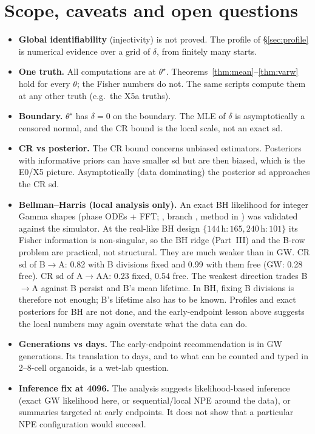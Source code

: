 \documentclass[11pt]{article}
\theoremstyle{definition}
\theoremstyle{remark}
\newcommand{\code}[1]{\texttt{\detokenize{#1}}}
\begin{document}
\section{Scope, caveats and open questions}\label{sec:open}
\begin{itemize}
\item \textbf{Global identifiability} (injectivity) is not proved. The profile of \S\ref{sec:profile} is numerical evidence over a grid of $\delta$, from finitely many starts.
\item \textbf{One truth.} All computations are at $\theta^\star$. Theorems~\ref{thm:mean}--\ref{thm:varw} hold for every $\theta$; the Fisher numbers do not. The same scripts compute them at any other truth (e.g.\ the X5a truths).
\item \textbf{Boundary.} $\theta^\star$ has $\delta=0$ on the boundary. The MLE of $\delta$ is asymptotically a censored normal, and the CR bound is the local scale, not an exact sd.
\item \textbf{CR vs posterior.} The CR bound concerns unbiased estimators. Posteriors with informative priors can have smaller sd but are then biased, which is the E0/X5 picture. Asymptotically (data dominating) the posterior sd approaches the CR sd.
\item \textbf{Bellman--Harris (local analysis only).} An exact BH likelihood for integer Gamma shapes (phase ODEs + FFT; \code{bhexact.py}, branch \code{bh-exact}, method in \code{exact_likelihood.pdf}) was validated against the simulator. At the real-like BH design $\{144\,\text{h}{:}165,240\,\text{h}{:}101\}$ its Fisher information is non-singular, so the BH ridge (Part~III) and the B-row problem are practical, not structural. They are much weaker than in GW. CR sd of B$\to$A: 0.82 with B divisions fixed and 0.99 with them free (GW: 0.28 free). CR sd of A$\to$AA: 0.23 fixed, 0.54 free. The weakest direction trades B$\to$A against B persist and B's mean lifetime. In BH, fixing B divisions is therefore not enough; B's lifetime also has to be known. Profiles and exact posteriors for BH are not done, and the early-endpoint lesson above suggests the local numbers may again overstate what the data can do.
\item \textbf{Generations vs days.} The early-endpoint recommendation is in GW generations. Its translation to days, and to what can be counted and typed in 2--8-cell organoids, is a wet-lab question.
\item \textbf{Inference fix at 4096.} The analysis suggests likelihood-based inference (exact GW likelihood here, or sequential/local NPE around the data), or summaries targeted at early endpoints. It does not show that a particular NPE configuration would succeed.
\end{itemize}
\end{document}
